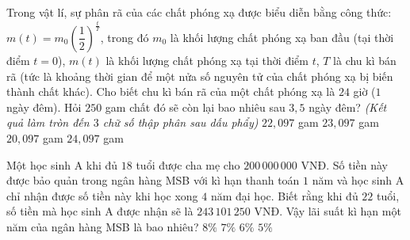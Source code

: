 \begin{ex}%
	Trong vật lí, sự phân rã của các chất phóng xạ được biểu diễn bằng công thức: $m(t) = m_0\left(\dfrac{1}{2}\right)^{\frac{t}{T}}$, trong đó $m_0$ là khối lượng chất phóng xạ ban đầu (tại thời điểm $t = 0$), $m(t)$ là khối lượng chất phóng xạ tại thời điểm $t$, $T$ là chu  kì bán rã (tức là khoảng thời gian để một nửa số nguyên tử của chất phóng xạ bị biến thành chất khác). Cho biết chu kì bán rã của một chất phóng xạ là $24$ giờ ($1$ ngày đêm). Hỏi $250$ gam chất đó sẽ còn lại bao nhiêu sau $3{,}5$ ngày đêm? \textit{(Kết quả làm tròn đến $3$ chữ số thập phân sau dấu phẩy)}
	 \choice
		 {\True $22{,}097$ gam}
		{$23{,}097$ gam} 
		 {$20{,}097$ gam}
		{$24{,}097$ gam} 
\end{ex}

\begin{ex}%
	Một học sinh A khi đủ $ 18 $ tuổi được cha mẹ cho $200\,000\,000$ VNĐ. Số tiền này được bảo quản trong ngân hàng MSB với kì hạn thanh toán $ 1 $ năm và học sinh A chỉ nhận được số tiền này khi học xong $ 4 $ năm đại học. Biết rằng khi đủ $ 22 $ tuổi, số tiền mà học sinh A được nhận sẽ là $243\,101\,250$ VNĐ. Vậy lãi suất kì hạn một năm của ngân hàng MSB là bao  nhiêu?
	 \choice
		 {$ 8\% $}
		{$ 7\%  $}
		{$ 6\%  $}
		 {\True $ 5\% $}
\end{ex}

